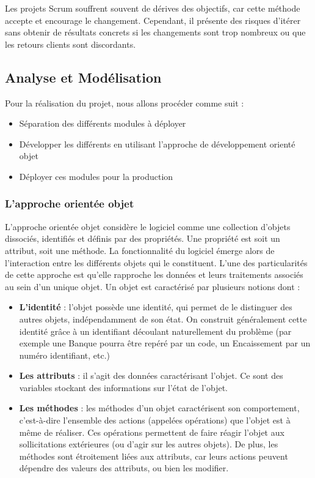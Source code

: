 Les projets Scrum souffrent souvent de dérives des objectifs, car cette méthode accepte et encourage le changement. Cependant, il présente des risques d’itérer sans obtenir de résultats concrets si les changements sont trop nombreux ou que les retours clients sont discordants.

\subsection{Analyse et Modélisation}

Pour la réalisation du projet, nous allons procéder comme suit :

\vspace{1em}
\begin{itemize}
	\setlength\itemsep{1em}
	\item Séparation des différents modules à déployer
	\item Développer les différents en utilisant l'approche de développement orienté objet
	\item Déployer ces modules pour la production
\end{itemize}

\subsubsection{L’approche orientée objet}

L’approche orientée objet considère le logiciel comme une collection d’objets dissociés,
identifiés et définis par des propriétés. Une propriété est soit un attribut, soit une méthode.
La fonctionnalité du logiciel émerge alors de l’interaction entre les différents objets qui le
constituent. L’une des particularités de cette approche est qu’elle rapproche les données et
leurs traitements associés au sein d’un unique objet. Un objet est caractérisé par plusieurs
notions dont :

\vspace{1em}
\begin{itemize}
	\setlength\itemsep{1em}
	\item \textbf{L’identité} : l’objet possède une identité, qui permet de le distinguer des autres objets, indépendamment de son état. On construit généralement cette identité grâce à un identifiant
	      découlant naturellement du problème (par exemple une Banque pourra être repéré par un code,
	      un Encaissement par un numéro identifiant, etc.)
	\item \textbf{Les attributs} : il s’agit des données caractérisant l’objet. Ce sont des variables stockant des
	      informations sur l’état de l’objet.
	\item \textbf{Les méthodes} : les méthodes d’un objet caractérisent son comportement, c’est-à-dire l’ensemble
	      des actions (appelées opérations) que l’objet est à même de réaliser. Ces opérations permettent
	      de faire réagir l’objet aux sollicitations extérieures (ou d’agir sur les autres objets). De plus, les
	      méthodes sont étroitement liées aux attributs, car leurs actions peuvent dépendre des valeurs
	      des attributs, ou bien les modifier.
\end{itemize}

